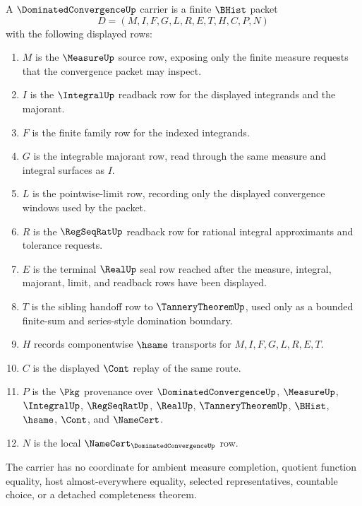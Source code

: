 \begin{definition}
\label{def:dominated-convergence-carrier}
A $\DominatedConvergenceUp$ carrier is a finite $\BHist$ packet
$$
D=(M,I,F,G,L,R,E,T,H,C,P,N)
$$
with the following displayed rows:
\begin{enumerate}
\item $M$ is the $\MeasureUp$ source row, exposing only the finite measure requests that the convergence packet may inspect.
\item $I$ is the $\IntegralUp$ readback row for the displayed integrands and the majorant.
\item $F$ is the finite family row for the indexed integrands.
\item $G$ is the integrable majorant row, read through the same measure and integral surfaces as $I$.
\item $L$ is the pointwise-limit row, recording only the displayed convergence windows used by the packet.
\item $R$ is the $\RegSeqRatUp$ readback row for rational integral approximants and tolerance requests.
\item $E$ is the terminal $\RealUp$ seal row reached after the measure, integral, majorant, limit, and readback rows have been displayed.
\item $T$ is the sibling handoff row to $\TanneryTheoremUp$, used only as a bounded finite-sum and series-style domination boundary.
\item $H$ records componentwise $\hsame$ transports for $M,I,F,G,L,R,E,T$.
\item $C$ is the displayed $\Cont$ replay of the same route.
\item $P$ is the $\Pkg$ provenance over $\DominatedConvergenceUp$, $\MeasureUp$, $\IntegralUp$, $\RegSeqRatUp$, $\RealUp$, $\TanneryTheoremUp$, $\BHist$, $\hsame$, $\Cont$, and $\NameCert$.
\item $N$ is the local $\NameCert_{\DominatedConvergenceUp}$ row.
\end{enumerate}
The carrier has no coordinate for ambient measure completion, quotient function equality, host almost-everywhere equality, selected representatives, countable choice, or a detached completeness theorem.
\end{definition}

